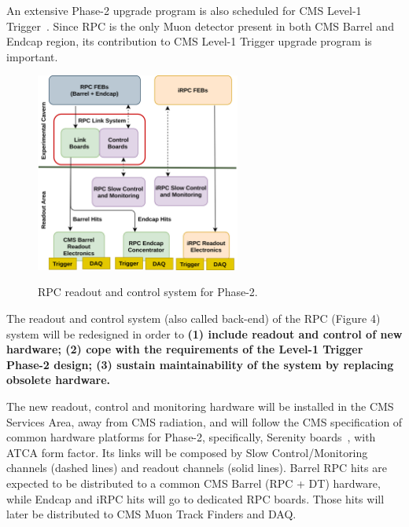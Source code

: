 An extensive Phase-2 upgrade program is also scheduled for CMS Level-1 Trigger~\cite{l1_tdr}. Since RPC is the only Muon detector present in both CMS Barrel and Endcap region, its contribution to CMS Level-1 Trigger upgrade program is important. 

\begin{figure}
    \caption{\footnotesize RPC readout and control system for Phase-2.}
    \includegraphics[width=0.6\textwidth]{uioposter-images/rpc_phase2_readout.png}
    \label{rpc_phase2_readout}
\end{figure}

The readout and control system (also called back-end) of the RPC (Figure 4) system will be redesigned in order to \textbf{(1) include readout and control of new hardware; (2) cope with the requirements of the Level-1 Trigger Phase-2 design; (3) sustain maintainability of the system by replacing obsolete hardware.}


The new readout, control and monitoring hardware will be installed in the CMS Services Area, away from CMS radiation, and will follow the CMS specification of common hardware platforms for Phase-2, specifically, Serenity boards~\cite{serenity}, with ATCA form factor. Its links will be composed by Slow Control/Monitoring channels (dashed lines) and readout channels (solid lines). Barrel RPC hits are expected to be distributed to a common CMS Barrel (RPC + DT) hardware, while Endcap and iRPC hits will go to dedicated RPC boards. Those hits will later be distributed to CMS Muon Track Finders and DAQ.

